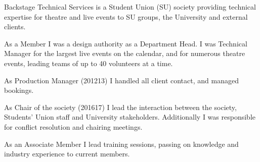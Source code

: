 \vspace{6pt}


Backstage Technical Services is a Student Union (SU) society providing technical expertise for theatre and live events to SU groups, the University and external clients.
\begin{tightemize}
    \item As a Member I was a design authority as a Department Head. I was Technical Manager for the largest live events on the calendar, and for numerous theatre events, leading teams of up to 40 volunteers at a time.
    \item As Production Manager (2012\textendash{}13) I handled all client contact, and managed bookings.
    \item As Chair of the society (2016\textendash{}17) I lead the interaction between the society, Students' Union staff and University stakeholders. Additionally I was responsible for conflict resolution and chairing meetings.
    \item As an Associate Member I lead training sessions, passing on knowledge and industry experience to current members.
\end{tightemize}
\sectionsep{}
